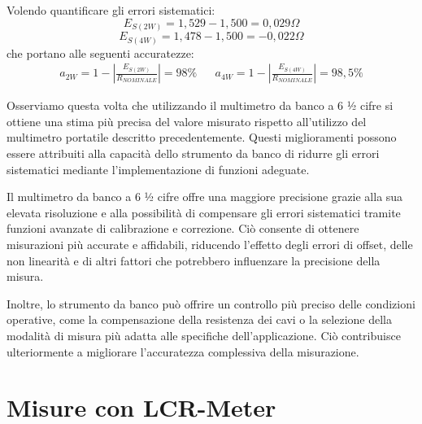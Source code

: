 \vspace{5mm}
Volendo quantificare gli errori sistematici:
\begin{equation*}
    E_{S(2W)} = 1,529 - 1,500 = 0,029 \Omega
\end{equation*}
\begin{equation*}
    E_{S(4W)} = 1,478 - 1,500 = -0,022 \Omega
\end{equation*}
che portano alle seguenti accuratezze: 
\begin{align*}
a_{2W} = 1 - \left| \frac{E_{S(2W)}}{R_{NOMINALE}} \right| = 98\%
   &&   
a_{4W} = 1 - \left| \frac{E_{S(4W)}}{R_{NOMINALE}} \right| = 98,5\%
\end{align*}

Osserviamo questa volta che utilizzando il multimetro da banco a 6 ½ cifre si ottiene una stima più precisa del valore misurato rispetto all'utilizzo del multimetro portatile descritto precedentemente. Questi miglioramenti possono essere attribuiti alla capacità dello strumento da banco di ridurre gli errori sistematici mediante l'implementazione di funzioni adeguate.

Il multimetro da banco a 6 ½ cifre offre una maggiore precisione grazie alla sua elevata risoluzione e alla possibilità di compensare gli errori sistematici tramite funzioni avanzate di calibrazione e correzione. Ciò consente di ottenere misurazioni più accurate e affidabili, riducendo l'effetto degli errori di offset, delle non linearità e di altri fattori che potrebbero influenzare la precisione della misura.

Inoltre, lo strumento da banco può offrire un controllo più preciso delle condizioni operative, come la compensazione della resistenza dei cavi o la selezione della modalità di misura più adatta alle specifiche dell'applicazione. Ciò contribuisce ulteriormente a migliorare l'accuratezza complessiva della misurazione.


\clearpage

\section{Misure con LCR-Meter}
\label{sec:lcr}

